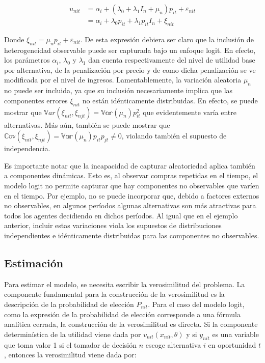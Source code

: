 \documentclass[
]{book}
\begin{document}
\[
\begin{aligned}
u_{nit} &= \alpha_i + (\lambda_0 + \lambda_1 I_n + \mu_n)p_{it} + \varepsilon_{nit}\\
&= \alpha_i + \lambda_0 p_{it} + \lambda_1p_{it}I_n + \xi_{nit}
\end{aligned}
\]

Donde \(\xi_{nit} = \mu_np_{it} + \varepsilon_{nit}\). De esta expresión debiera ser claro que la inclusión de heterogeneidad
observable puede ser capturada bajo un enfoque logit. En efecto, los parámetros \(\alpha_i\), \(\lambda_0\) y \(\lambda_1\) dan cuenta respectivamente del nivel de utilidad base por alternativa, de la penalización por precio y de como dicha penalización se ve modificada por el nivel de ingresos. Lamentablemente, la
variación aleatoria \(\mu_n\) no puede ser incluida, ya que su inclusión necesariamente implica que las componentes errores \(\xi_{nit}\) no están idénticamente distribuidas. En efecto, se puede mostrar que \(\mathbb{V}ar(\xi_{nit}, \xi_{njt}) = \mathbb{Var}(\mu_n)p^2_{it}\) que evidentemente varía entre alternativas. Más aún, también se puede mostrar que \(\mathbb{Cov}(\xi_{nit}, \xi_{njt}) = \mathbb{Var}(\mu_n)p_{it}p_{jt} \neq 0\), violando también el supuesto de independencia.

Es importante notar que la incapacidad de capturar aleatoriedad aplica también a componentes dinámicas. Esto es, al observar compras repetidas en el tiempo, el modelo logit no permite capturar que hay componentes no observables que varíen en el tiempo. Por ejemplo, no se puede incorporar que, debido a factores externos no observables, en algunos períodos algunas alternativas son más atractivas para todos los agentes decidiendo en dichos períodos. Al igual que en el ejemplo anterior, incluir estas variaciones viola los supuestos de distribuciones independientes e idénticamente distribuidas para las componentes no observables.

\subsection{Estimación}\label{estimaciuxf3n-1}

Para estimar el modelo, se necesita escribir la verosimilitud del problema. La componente fundamental para la construcción de la verosimilitud es la descripción de la probabilidad de
elección \(P_{nit}\). Para el caso del modelo logit, como la expresión de la probabilidad de elección corresponde a una fórmula analítica cerrada, la construcción de la verosimilitud es directa. Si la componente determinística de la utilidad viene dada por \(v_{nit}(x_{nit}, \theta)\) y si \(y_{nit}\) es una variable que toma valor 1 si el tomador de decisión \(n\) escoge alternativa \(i\) en oportunidad \(t\), entonces la verosimilitud viene dada por:
\end{document}

